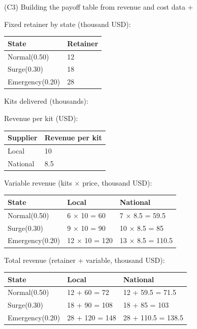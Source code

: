 \documentclass[11pt]{article}
\begin{document}
	
	(C3) Building the payoff table from revenue and cost data
	+
	
	
	Fixed retainer by state (thousand USD):
	\begin{center}
		\begin{tabular}{ll}
			\toprule
			State & Retainer \\
			\midrule
			Normal\newline (0.50) & 12 \\
			Surge\newline (0.30) & 18 \\
			Emergency\newline (0.20) & 28 \\
			\bottomrule
		\end{tabular}
	\end{center}
	
	
	Kits delivered (thousands):
	
	Revenue per kit (USD):
	\begin{center}
		\begin{tabular}{ll}
			\toprule
			Supplier & Revenue per kit \\
			\midrule
			Local & 10 \\
			National & 8.5 \\
			\bottomrule
		\end{tabular}
	\end{center}
	
	
	Variable revenue (kits × price, thousand USD):
	\begin{center}
		\begin{tabular}{lll}
			\toprule
			State & Local & National \\
			\midrule
			Normal\newline (0.50) & 6 × 10 = 60 & 7 × 8.5 = 59.5 \\
			Surge\newline (0.30) & 9 × 10 = 90 & 10 × 8.5 = 85 \\
			Emergency\newline (0.20) & 12 × 10 = 120 & 13 × 8.5 = 110.5 \\
			\bottomrule
		\end{tabular}
	\end{center}
	
	
	Total revenue (retainer + variable, thousand USD):
	\begin{center}
		\begin{tabular}{lll}
			\toprule
			State & Local & National \\
			\midrule
			Normal\newline (0.50) & 12 + 60 = 72 & 12 + 59.5 = 71.5 \\
			Surge\newline (0.30) & 18 + 90 = 108 & 18 + 85 = 103 \\
			Emergency\newline (0.20) & 28 + 120 = 148 & 28 + 110.5 = 138.5 \\
			\bottomrule
		\end{tabular}
	\end{center}
	
\end{document}
